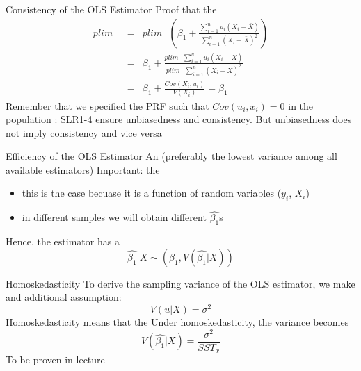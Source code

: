 \begin{frame}{Consistency of the OLS Estimator}
Proof that the 
\begin{eqnarray}
plim \mbox{  } &=& plim \mbox{  } \left( \beta_1 + \frac{\displaystyle\sum_{i=1}^n u_i(X_i-\bar{X})}{\displaystyle\sum_{i=1}^n (X_i-\bar{X})^2} \right) \nonumber \\
&=& \beta_1 + \frac{plim \mbox{  } \displaystyle\sum_{i=1}^n u_i(X_i-\bar{X})}{ plim \mbox{  }\displaystyle\sum_{i=1}^n (X_i-\bar{X})^2}  \\
&=& \beta_1 + \frac{Cov(X_i, u_i)}{V(X_i)}=\beta_1
\label{eq26}
\end{eqnarray}
\vfill
Remember that we specified the PRF such that $Cov(u_i, x_i)=0$ in the population
\vfill
\pause
{}: SLR1-4 ensure unbiasedness and consistency. But unbiasedness does not imply consistency and vice versa
\end{frame}

\begin{frame}{Efficiency of the OLS Estimator}
An  (preferably the lowest variance among all available estimators)
\vfill
Important: the 
\begin{itemize}
\item this is the case becuase it is a function of random variables ($y_i$, $X_i$)
\pause
\item in different samples we will obtain different $\widehat{\beta_1}$s
\end{itemize}
\vfill
Hence, the estimator has a 
\begin{equation}
\widehat{\beta_1}|X \sim (\beta_1, V(\widehat{\beta_1}|X))
\label{eq27}
\end{equation}
\end{frame}


\begin{frame}{Homoskedasticity}
To derive the sampling variance of the OLS estimator, we make and additional assumption:
\vfill
{}
\begin{equation}
V(u|X)=\sigma^2
\label{eq27}
\end{equation}
\vfill
Homoskedasticity means that the 
\vfill
\pause
Under homoskedasticity, the variance becomes 
\begin{equation}
V(\widehat{\beta_1}|X)=\frac{\sigma^2}{SST_x}
\label{eq28}
\end{equation}
To be proven in lecture
\end{frame}


